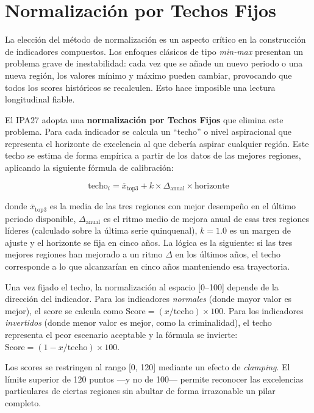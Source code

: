 \documentclass[12pt,a4paper]{article}
\begin{document}
\section{Normalización por Techos Fijos}

La elección del método de normalización es un aspecto crítico en la construcción de indicadores compuestos. Los enfoques clásicos de tipo \textit{min-max} presentan un problema grave de inestabilidad: cada vez que se añade un nuevo periodo o una nueva región, los valores mínimo y máximo pueden cambiar, provocando que todos los scores históricos se recalculen. Esto hace imposible una lectura longitudinal fiable.

El IPA27 adopta una \textbf{normalización por Techos Fijos} que elimina este problema. Para cada indicador se calcula un ``techo'' o nivel aspiracional que representa el horizonte de excelencia al que debería aspirar cualquier región. Este techo se estima de forma empírica a partir de los datos de las mejores regiones, aplicando la siguiente fórmula de calibración:

\begin{equation}
\text{techo}_i = \overline{x}_{\text{top3}} + k \times \Delta_{\text{anual}} \times \text{horizonte}
\end{equation}

donde $\overline{x}_{\text{top3}}$ es la media de las tres regiones con mejor desempeño en el último periodo disponible, $\Delta_{\text{anual}}$ es el ritmo medio de mejora anual de esas tres regiones líderes (calculado sobre la última serie quinquenal), $k=1.0$ es un margen de ajuste y el horizonte se fija en cinco años. La lógica es la siguiente: si las tres mejores regiones han mejorado a un ritmo $\Delta$ en los últimos años, el techo corresponde a lo que alcanzarían en cinco años manteniendo esa trayectoria.

Una vez fijado el techo, la normalización al espacio [0--100] depende de la dirección del indicador. Para los indicadores \emph{normales} (donde mayor valor es mejor), el score se calcula como $\text{Score} = (x / \text{techo}) \times 100$. Para los indicadores \emph{invertidos} (donde menor valor es mejor, como la criminalidad), el techo representa el peor escenario aceptable y la fórmula se invierte: $\text{Score} = (1 - x / \text{techo}) \times 100$.

Los scores se restringen al rango [0, 120] mediante un efecto de \textit{clamping}. El límite superior de 120 puntos ---y no de 100--- permite reconocer las excelencias particulares de ciertas regiones sin abultar de forma irrazonable un pilar completo.
\end{document}

